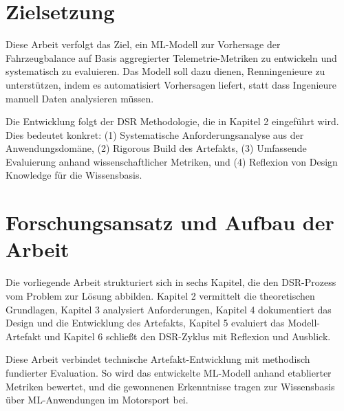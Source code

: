 \section{Zielsetzung}

Diese Arbeit verfolgt das Ziel, ein \ac{ML}-Modell zur Vorhersage der Fahrzeugbalance auf Basis aggregierter Telemetrie-Metriken zu entwickeln und systematisch zu evaluieren. Das Modell soll dazu dienen, Renningenieure zu unterstützen, indem es automatisiert Vorhersagen liefert, statt dass Ingenieure manuell Daten analysieren müssen.

Die Entwicklung folgt der \ac{DSR} Methodologie, die in Kapitel 2 eingeführt wird. Dies bedeutet konkret: (1) Systematische Anforderungsanalyse aus der Anwendungsdomäne, (2) Rigorous Build des Artefakts, (3) Umfassende Evaluierung anhand wissenschaftlicher Metriken, und (4) Reflexion von Design Knowledge für die Wissensbasis.

\section{Forschungsansatz und Aufbau der Arbeit}

Die vorliegende Arbeit strukturiert sich in sechs Kapitel, die den DSR-Prozess vom Problem zur Lösung abbilden. Kapitel 2 vermittelt die theoretischen Grundlagen, Kapitel 3 analysiert Anforderungen, Kapitel 4 dokumentiert das Design und die Entwicklung des Artefakts, Kapitel 5 evaluiert das Modell-Artefakt und Kapitel 6 schließt den DSR-Zyklus mit Reflexion und Ausblick.

Diese Arbeit verbindet technische Artefakt-Entwicklung mit methodisch fundierter 
Evaluation. So wird das entwickelte \ac{ML}-Modell anhand etablierter Metriken bewertet, 
und die gewonnenen Erkenntnisse tragen zur Wissensbasis über \ac{ML}-Anwendungen im 
Motorsport bei.